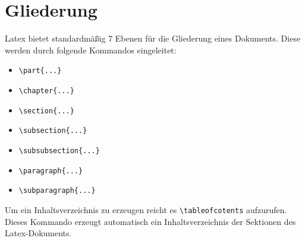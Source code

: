 \section{Gliederung}
Latex bietet standardmäßig 7 Ebenen für die Gliederung eines Dokuments. Diese werden durch folgende Kommandos
eingeleitet:
\begin{itemize}
\item \verb+\part{...}+
\item \verb+\chapter{...}+
\item \verb+\section{...}+
\item \verb+\subsection{...}+
\item \verb+\subsubsection{...}+
\item \verb+\paragraph{...}+
\item \verb+\subparagraph{...}+        
\end{itemize}

Um ein Inhaltsverzeichnis zu erzeugen reicht es \verb+\tableofcotents+ aufzurufen. Dieses Kommando erzeugt
automatisch ein Inhaltsverzeichnis der Sektionen des Latex-Dokuments.

